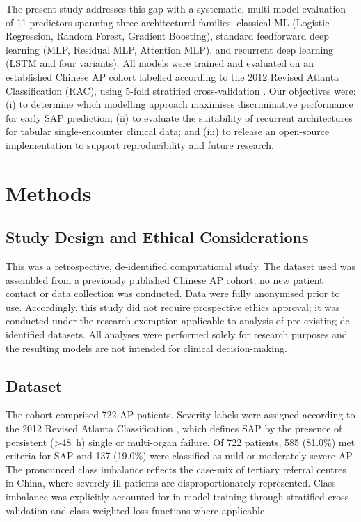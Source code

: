 \documentclass[12pt,a4paper]{article}
\begin{document}
The present study addresses this gap with a systematic, multi-model evaluation of 11 predictors spanning three architectural families: classical ML (Logistic Regression, Random Forest, Gradient Boosting), standard feedforward deep learning (MLP, Residual MLP, Attention MLP), and recurrent deep learning (LSTM and four variants). All models were trained and evaluated on an established Chinese AP cohort labelled according to the 2012 Revised Atlanta Classification (RAC), using 5-fold stratified cross-validation \citep{Banks2013}. Our objectives were: (i) to determine which modelling approach maximises discriminative performance for early SAP prediction; (ii) to evaluate the suitability of recurrent architectures for tabular single-encounter clinical data; and (iii) to release an open-source implementation to support reproducibility and future research.

\section{Methods}

\subsection{Study Design and Ethical Considerations}

This was a retrospective, de-identified computational study. The dataset used was assembled from a previously published Chinese AP cohort; no new patient contact or data collection was conducted. Data were fully anonymised prior to use. Accordingly, this study did not require prospective ethics approval; it was conducted under the research exemption applicable to analysis of pre-existing de-identified datasets. All analyses were performed solely for research purposes and the resulting models are not intended for clinical decision-making.

\subsection{Dataset}

The cohort comprised 722 AP patients. Severity labels were assigned according to the 2012 Revised Atlanta Classification \citep{Banks2013}, which defines SAP by the presence of persistent (>48~h) single or multi-organ failure. Of 722 patients, 585 (81.0\%) met criteria for SAP and 137 (19.0\%) were classified as mild or moderately severe AP. The pronounced class imbalance reflects the case-mix of tertiary referral centres in China, where severely ill patients are disproportionately represented. Class imbalance was explicitly accounted for in model training through stratified cross-validation and class-weighted loss functions where applicable.
\end{document}
